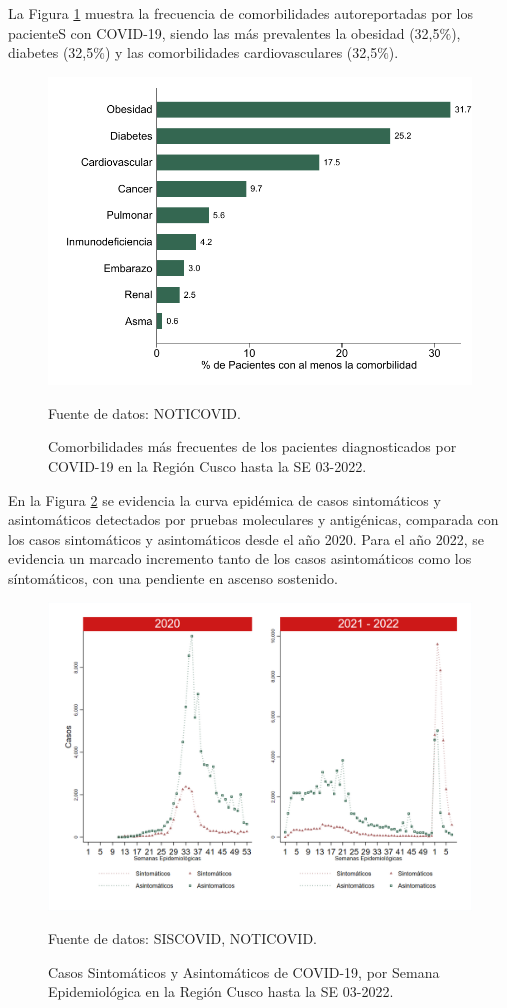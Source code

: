 \documentclass[12pt,a4paper,openany]{book}
\begin{document}
La Figura \ref{fig:comorbilidades} muestra la frecuencia de comorbilidades autoreportadas por los pacienteS con COVID-19, siendo las más prevalentes la obesidad (32,5$\%$), diabetes (32,5$\%$) y las comorbilidades cardiovasculares (32,5$\%$).  
\begin{figure}[h]
	\caption{Comorbilidades más frecuentes de los pacientes diagnosticados por COVID-19 en la Región Cusco hasta la SE 03-2022. }\label{fig:comorbilidades}
	\begin{center}
		\includegraphics[width=0.65\linewidth]{../figuras/figura_comorbilidad.pdf}
	\end{center}
	{\footnotesize {Fuente de datos: NOTICOVID.}}
\end{figure}
\clearpage
 En la Figura \ref{fig:sintomaticos_asintomati} se evidencia la curva epidémica de casos sintomáticos y asintomáticos detectados por pruebas moleculares y antigénicas, comparada con los casos sintomáticos y asintomáticos desde el año 2020. Para el año 2022, se evidencia un marcado incremento tanto de los casos asintomáticos como los síntomáticos, con una pendiente en ascenso sostenido.  
 
\begin{figure}[h]
	\caption{Casos Sintomáticos y Asintomáticos de COVID-19, por Semana Epidemiológica en la Región Cusco hasta la SE 03-2022.  }\label{fig:sintomaticos_asintomati}
	
	\begin{center}
		\includegraphics[width=0.75\linewidth]{../figuras/sintomaticos_20_21_22.png}
	\end{center}
	{\footnotesize {Fuente de datos: SISCOVID, NOTICOVID.}}
\end{figure}
\clearpage
\end{document}
